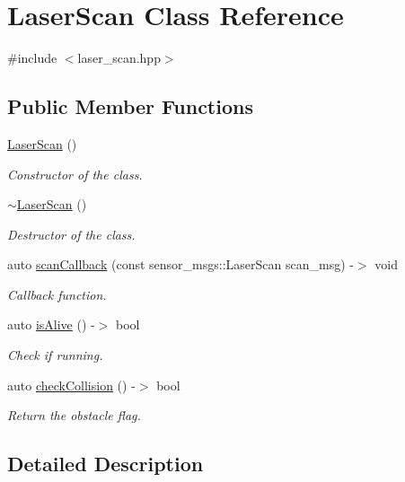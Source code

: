 \hypertarget{class_laser_scan}{}\section{Laser\+Scan Class Reference}
\label{class_laser_scan}


{\ttfamily \#include $<$laser\+\_\+scan.\+hpp$>$}

\subsection*{Public Member Functions}
\begin{DoxyCompactItemize}
\item 
\hyperlink{class_laser_scan_ae1c29cf38fcdf0c649691b8c609e5ce7}{Laser\+Scan} ()
\begin{DoxyCompactList}\small\item\em Constructor of the class. \end{DoxyCompactList}\item 
\hyperlink{class_laser_scan_adab7acdb2d59acb2350a1e4d93981b8a}{$\sim$\+Laser\+Scan} ()
\begin{DoxyCompactList}\small\item\em Destructor of the class. \end{DoxyCompactList}\item 
auto \hyperlink{class_laser_scan_a5550d5c98d7456d6f90fd34bda650cde}{scan\+Callback} (const sensor\+\_\+msgs\+::\+Laser\+Scan scan\+\_\+msg) -\/$>$ void
\begin{DoxyCompactList}\small\item\em Callback function. \end{DoxyCompactList}\item 
auto \hyperlink{class_laser_scan_aab0d1a864bf9d96a0396f1235d327dbd}{is\+Alive} () -\/$>$ bool
\begin{DoxyCompactList}\small\item\em Check if running. \end{DoxyCompactList}\item 
auto \hyperlink{class_laser_scan_ac86a1b1d140a88c4f4f47aaddc6de798}{check\+Collision} () -\/$>$ bool
\begin{DoxyCompactList}\small\item\em Return the obstacle flag. \end{DoxyCompactList}\end{DoxyCompactItemize}


\subsection{Detailed Description}


